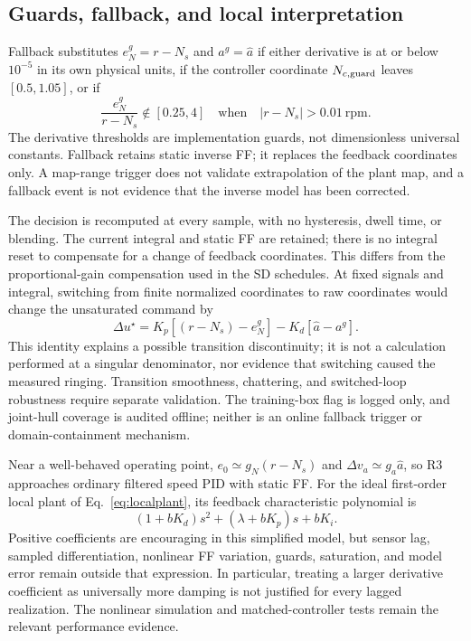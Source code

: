 
\subsection{Guards, fallback, and local interpretation}
Fallback substitutes $e_N^g=r-N_s$ and $a^g=\hat a$ if either derivative is at or below $10^{-5}$ in its own physical units, if the controller coordinate $N_{c,\rm guard}$ leaves $[0.5,1.05]$, or if
\begin{equation}
\frac{e_N^g}{r-N_s}\notin[0.25,4]\quad\text{when}\quad|r-N_s|>0.01\ \mathrm{rpm}.
\end{equation}
The derivative thresholds are implementation guards, not dimensionless universal constants. Fallback retains static inverse FF; it replaces the feedback coordinates only. A map-range trigger does not validate extrapolation of the plant map, and a fallback event is not evidence that the inverse model has been corrected.

The decision is recomputed at every sample, with no hysteresis, dwell time, or blending. The current integral and static FF are retained; there is no integral reset to compensate for a change of feedback coordinates. This differs from the proportional-gain compensation used in the SD schedules. At fixed signals and integral, switching from finite normalized coordinates to raw coordinates would change the unsaturated command by
\begin{equation}
\Delta u^\star=K_p[(r-N_s)-e_N^g]-K_d[\hat a-a^g].
\end{equation}
This identity explains a possible transition discontinuity; it is not a calculation performed at a singular denominator, nor evidence that switching caused the measured ringing. Transition smoothness, chattering, and switched-loop robustness require separate validation. The training-box flag is logged only, and joint-hull coverage is audited offline; neither is an online fallback trigger or domain-containment mechanism.

Near a well-behaved operating point, $e_0\simeq g_N(r-N_s)$ and $\Delta v_a\simeq g_a\hat a$, so R3 approaches ordinary filtered speed PID with static FF. For the ideal first-order local plant of Eq.~\eqref{eq:localplant}, its feedback characteristic polynomial is
\begin{equation}
(1+bK_d)s^2+(\lambda+bK_p)s+bK_i.
\end{equation}
Positive coefficients are encouraging in this simplified model, but sensor lag, sampled differentiation, nonlinear FF variation, guards, saturation, and model error remain outside that expression. In particular, treating a larger derivative coefficient as universally more damping is not justified for every lagged realization. The nonlinear simulation and matched-controller tests remain the relevant performance evidence.

